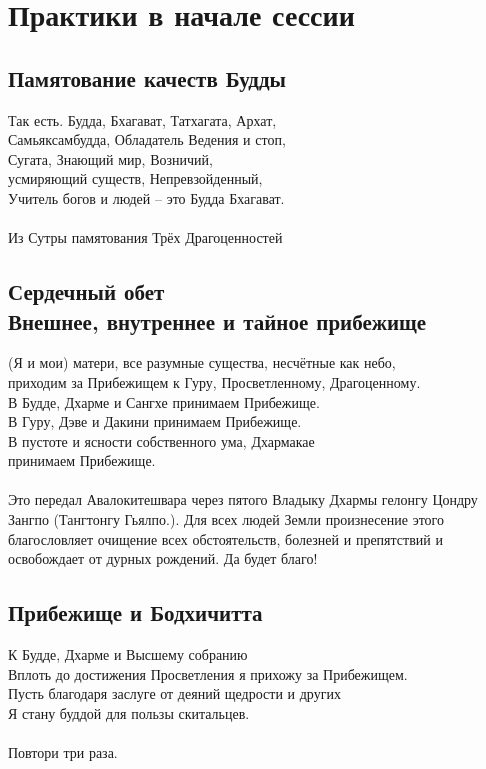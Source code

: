 \section{Практики в начале сессии}

\subsection{Памятование качеств Будды}

Так есть. Будда, Бхагават, Татхагата, Архат,\\
Самьяксамбудда, Обладатель Ведения и стоп,\\
Сугата, Знающий мир, Возничий,\\
усмиряющий существ, Непревзойденный,\\
Учитель богов и людей – это Будда Бхагават.\\
\\
\scriptsize
Из Сутры памятования Трёх Драгоценностей
\normalsize

\subsection{Сердечный обет \\Внешнее, внутреннее и тайное прибежище}

(Я и мои) матери, все разумные существа, несчётные как небо,\\
приходим за Прибежищем к Гуру, Просветленному, Драгоценному.\\
В Будде, Дхарме и Сангхе принимаем Прибежище.\\
В Гуру, Дэве и Дакини принимаем Прибежище.\\
В пустоте и ясности собственного ума, Дхармакае \\ \indent принимаем Прибежище.\\
\\
\scriptsize
Это передал Авалокитешвара через пятого Владыку Дхармы
гелонгу Цондру Зангпо (Тангтонгу Гьялпо.).
Для всех людей Земли произнесение этого благословляет
очищение всех обстоятельств, болезней и препятствий
и освобождает от дурных рождений. Да будет благо!
\normalsize

\subsection{Прибежище и Бодхичитта}

К Будде, Дхарме и Высшему собранию\\
Вплоть до достижения Просветления я прихожу за Прибежищем.\\
Пусть благодаря заслуге от деяний щедрости и других\\
Я стану буддой для пользы скитальцев.\\
\\
\indent Повтори три раза.\\

